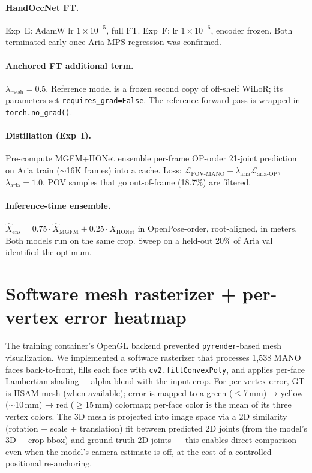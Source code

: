 \documentclass{article}
\begin{document}
\paragraph{HandOccNet FT.}
Exp~E: AdamW lr $1\!\times\!10^{-5}$, full FT. Exp~F: lr $1\!\times\!10^{-6}$, encoder frozen. Both terminated early once Aria-MPS regression was confirmed.

\paragraph{Anchored FT additional term.}
$\lambda_{\text{mesh}} = 0.5$. Reference model is a frozen second copy of off-shelf WiLoR; its parameters set \texttt{requires\_grad=False}. The reference forward pass is wrapped in \texttt{torch.no\_grad()}.

\paragraph{Distillation (Exp~I).}
Pre-compute MGFM+HONet ensemble per-frame OP-order 21-joint prediction on Aria train ($\sim$16K frames) into a cache. Loss: $\mathcal{L}_{\text{POV-MANO}} + \lambda_{\text{aria}} \mathcal{L}_{\text{aria-OP}}$, $\lambda_{\text{aria}}=1.0$. POV samples that go out-of-frame (18.7\%) are filtered.

\paragraph{Inference-time ensemble.}
$\hat{X}_{\text{ens}} = 0.75 \cdot \hat{X}_{\text{MGFM}} + 0.25 \cdot \hat{X}_{\text{HONet}}$ in OpenPose-order, root-aligned, in meters. Both models run on the same crop. Sweep on a held-out 20\% of Aria val identified the optimum.

\section{Software mesh rasterizer + per-vertex error heatmap}
\label{app:viz}

The training container's OpenGL backend prevented \texttt{pyrender}-based mesh visualization. We implemented a software rasterizer that processes 1{,}538 MANO faces back-to-front, fills each face with \texttt{cv2.fillConvexPoly}, and applies per-face Lambertian shading + alpha blend with the input crop. For per-vertex error, GT is HSAM mesh (when available); error is mapped to a green ($\le$7\,mm) → yellow ($\sim$10\,mm) → red ($\ge$15\,mm) colormap; per-face color is the mean of its three vertex colors. The 3D mesh is projected into image space via a 2D similarity (rotation + scale + translation) fit between predicted 2D joints (from the model's 3D + crop bbox) and ground-truth 2D joints — this enables direct comparison even when the model's camera estimate is off, at the cost of a controlled positional re-anchoring.
\end{document}
